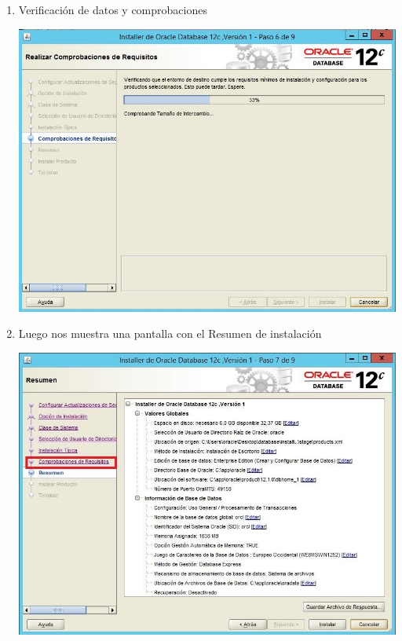 \begin{enumerate}[1.]
	\item Verificaci\'on de datos y comprobaciones\\
	\begin{center}
	\includegraphics[width=15cm]{./Imagenes/img18} 
	\end{center}

	\item Luego nos muestra una pantalla con el Resumen de instalaci\'on\\
	\begin{center}
	\includegraphics[width=15cm]{./Imagenes/img19} 
	\end{center}


\end{enumerate}
